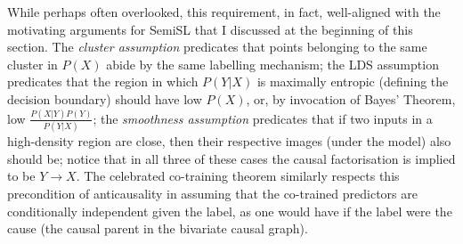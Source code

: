 While perhaps often overlooked, this requirement, in fact, well-aligned with the motivating
arguments for \ac{SemiSL} that I discussed at the beginning of this section.
%
The \emph{cluster assumption} predicates that points belonging to the same cluster in \(P(X)\)
abide by the same labelling mechanism; 
%
the LDS assumption predicates that the region in which \(P(Y|X)\) is maximally entropic (defining
the decision boundary) should have low \(P(X)\), or, by invocation of Bayes' Theorem, low \( \frac{
P(X|Y)P(Y) }{ P(Y|X) } \); 
%
the \emph{smoothness assumption} predicates that if two inputs in a high-density region are close,
then their respective images (under the model) also should be;
%
notice that in all three of these cases the causal factorisation is implied to be \(Y \to X \).
%
The celebrated co-training theorem \citep{blum1998combining} similarly respects this precondition
of anticausality in assuming that the co-trained predictors are conditionally independent given the
label, as one would have if the label were the cause (the causal parent in the bivariate causal
graph).
%


